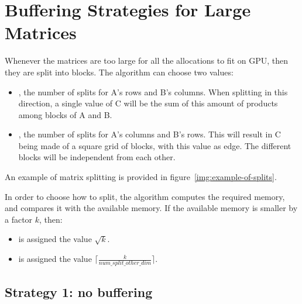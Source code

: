 \section{Buffering Strategies for Large Matrices}
\label{sec:strategies}


Whenever the matrices are too large for all the allocations to fit on GPU, then they are split into blocks.
The algorithm can choose two values:
\begin{itemize}
	\item {}, the number of splits for A's rows and B's columns. When splitting in this direction, a single value of C will be the sum of this amount of products among blocks of A and B.
	\item{}, the number of splits for A's columns and B's rows. This will result in C being made of a square grid of blocks, with this value as edge. The different blocks will be independent from each other.
\end{itemize}

An example of matrix splitting is provided in figure~\ref{img:example-of-splits}.


In order to choose how to split, the algorithm computes the required memory, and compares it with the available memory.
If the available memory is smaller by a factor $k$, then:
\begin{itemize}
	\itemsep 0em
	\item {} is assigned the value $\sqrt{k}$.
	\item{} is assigned the value $\lceil \frac{k}{num\_split\_other\_dim} \rceil$.
\end{itemize}


\subsection{Strategy 1: no buffering}

